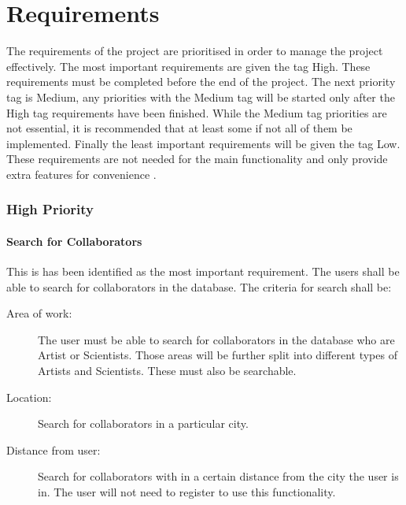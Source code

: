 \documentclass[a4paper,oneside,11pt]{report}
\begin{document}

\chapter{Requirements}
The requirements of the project are prioritised in order to manage the project effectively. The most important requirements are given the tag High. These requirements must be completed before the end of the project. The next priority tag is Medium, any priorities with the Medium tag will be started only after the High tag requirements have been finished. While the Medium tag priorities are not essential, it is recommended that at least some if not all of them be implemented. Finally the least important requirements will be given the tag Low. These requirements are not needed for the main functionality and only provide extra features for convenience .

\subsection{High Priority}
\subsubsection{Search for Collaborators} 
This is has been identified as the most important requirement. The users shall be able to search for collaborators in the database. The criteria for search shall be:
\begin{description}
	\item[Area of work:] The user must be able to search for collaborators in the database who are Artist or Scientists. Those areas will be further split into different types of Artists and Scientists. These must also be searchable.
	\item[Location:] Search for collaborators in a particular city.
	\item[Distance from user:] Search for collaborators with in a certain distance from the city the user is in. The user will not need to register to use this functionality.
\end{description}
	
\end{document}
